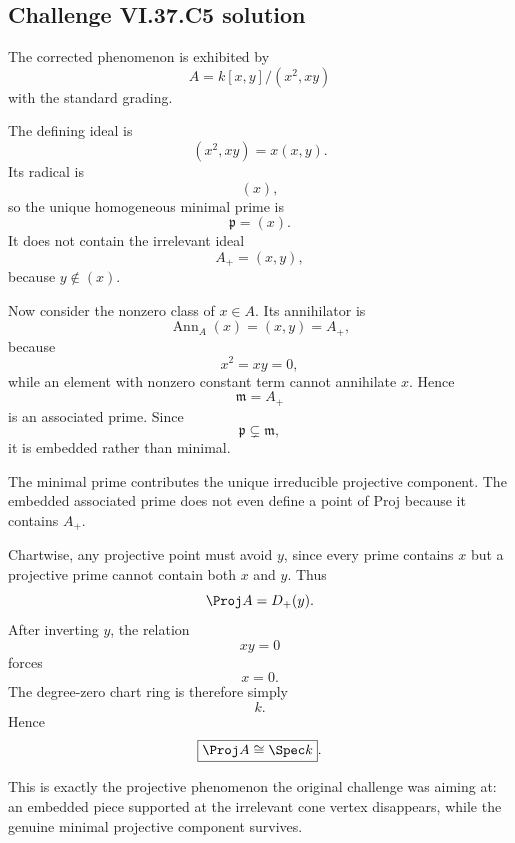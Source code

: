 \subsection*{Challenge VI.37.C5 solution}
\begin{solution}
The corrected phenomenon is exhibited by
\[
A=k[x,y]/(x^2,xy)
\]
with the standard grading.

The defining ideal is
\[
(x^2,xy)=x(x,y).
\]
Its radical is
\[
(x),
\]
so the unique homogeneous minimal prime is
\[
\mathfrak p=(x).
\]
It does not contain the irrelevant ideal
\[
A_+=(x,y),
\]
because \(y\notin(x)\).

Now consider the nonzero class of \(x\in A\). Its annihilator is
\[
\operatorname{Ann}_A(x)=(x,y)=A_+,
\]
because
\[
x^2=xy=0,
\]
while an element with nonzero constant term cannot annihilate \(x\). Hence
\[
\mathfrak m=A_+
\]
is an associated prime. Since
\[
\mathfrak p\subsetneq\mathfrak m,
\]
it is embedded rather than minimal.

The minimal prime contributes the unique irreducible projective component. The embedded associated prime does not even define a point of Proj because it contains \(A_+\).

Chartwise, any projective point must avoid \(y\), since every prime contains \(x\) but a projective prime cannot contain both \(x\) and \(y\). Thus
\[
\Proj A=D_+(y).
\]
After inverting \(y\), the relation
\[
xy=0
\]
forces
\[
x=0.
\]
The degree-zero chart ring is therefore simply
\[
k.
\]
Hence
\[
\boxed{\Proj A\cong\Spec k}.
\]

This is exactly the projective phenomenon the original challenge was aiming at: an embedded piece supported at the irrelevant cone vertex disappears, while the genuine minimal projective component survives.
\end{solution}
